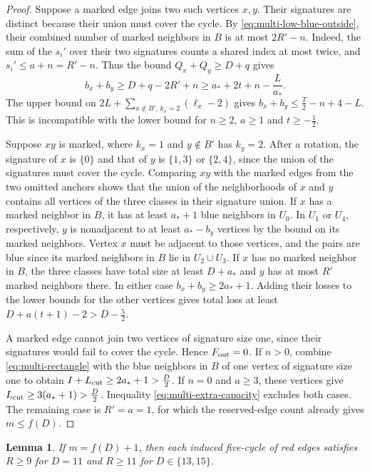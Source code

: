 \documentclass[preprint,11pt,numbers]{elsarticle-arxiv}
\numberwithin{equation}{section}
\newtheorem{lemma}[theorem]{Lemma}
\theoremstyle{definition}
\begin{document}
\begin{proof}
Suppose a marked edge joins two such vertices $x,y$. Their
signatures are distinct because their union must cover the cycle.
By \eqref{eq:multi-low-blue-outside}, their combined number of
marked neighbors in $B$ is at most $2R'-n$. Indeed, the sum of
the $s_i'$ over their two signatures counts a shared index at most
twice, and $s_i'\le a+n=R'-n$. Thus the bound $Q_x+Q_y\ge D+q$
gives
\[
 b_x+b_y\ge D+q-2R'+n\ge a_*+2t+n-\frac{L}{a_*}.
\]
The upper bound on $2L+\sum_{x\notin B',\,k_x=2}(\ell_x-2)$
gives $b_x+b_y\le \frac{T}{2}-n+4-L$. This is incompatible with
the lower bound for $n\ge2$, $a\ge1$ and $t\ge-\frac{1}{2}$.

Suppose $xy$ is marked, where $k_x=1$ and $y\notin B'$ has
$k_y=2$. After a rotation, the signature of $x$ is $\{0\}$ and
that of $y$ is $\{1,3\}$ or $\{2,4\}$, since the union of the
signatures must cover the cycle. Comparing $xy$ with the marked
edges from the two omitted anchors shows that the union of the
neighborhoods of $x$ and $y$ contains all vertices of the three
classes in their signature union.
If $x$ has a marked neighbor in $B$, it has at least $a_*+1$
blue neighbors in $U_0$. In $U_1$ or $U_4$, respectively, $y$ is
nonadjacent to at least $a_*-b_y$ vertices by the bound on its
marked neighbors. Vertex $x$ must be adjacent to those vertices,
and the pairs are blue since its marked neighbors in $B$ lie in
$U_2\cup U_3$. If $x$ has no marked neighbor in $B$, the three
classes have total size at least $D+a_*$ and $y$ has at most $R'$
marked neighbors there. In either case $b_x+b_y\ge 2a_*+1$.
Adding their losses to the lower bounds for the other vertices
gives total loss at least $D+a(t+1)-2>D-\frac{5}{2}$.

A marked edge cannot join two vertices of signature size one,
since their signatures would fail to cover the cycle. Hence
$F_{\rm out}=0$. If $n>0$, combine \eqref{eq:multi-rectangle}
with the blue neighbors in $B$ of one vertex of signature size one
to obtain $I+L_{\rm cut}\ge2a_*+1>\frac{D}{2}$. If $n=0$ and
$a\ge3$, these vertices give $L_{\rm cut}\ge3(a_*+1)>\frac{D}{2}$.
Inequality \eqref{eq:multi-extra-capacity} excludes both cases.
The remaining case is $R'=a=1$, for which the reserved-edge
count already gives $m\le f(D)$.


\end{proof}

\begin{lemma}\label{lem:odd-slack-refinements}
If $m=f(D)+1$, then each induced five-cycle of red edges satisfies
$R\ge9$ for $D=11$ and $R\ge11$ for $D\in\{13,15\}$.
\end{lemma}
\end{document}

